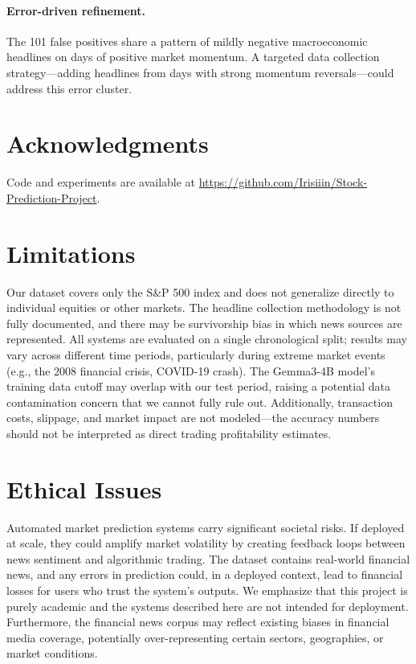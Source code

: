 \documentclass[11pt]{article}
\begin{document}
\paragraph{Error-driven refinement.} The 101 false positives share a pattern of mildly negative macroeconomic headlines on days of positive market momentum. A targeted data collection strategy—adding headlines from days with strong momentum reversals—could address this error cluster.

\section*{Acknowledgments}

Code and experiments are available at \url{https://github.com/Irisiiin/Stock-Prediction-Project}.

\section*{Limitations}

Our dataset covers only the S\&P 500 index and does not generalize directly to individual equities or other markets. The headline collection methodology is not fully documented, and there may be survivorship bias in which news sources are represented. All systems are evaluated on a single chronological split; results may vary across different time periods, particularly during extreme market events (e.g., the 2008 financial crisis, COVID-19 crash). The Gemma3-4B model's training data cutoff may overlap with our test period, raising a potential data contamination concern that we cannot fully rule out. Additionally, transaction costs, slippage, and market impact are not modeled—the accuracy numbers should not be interpreted as direct trading profitability estimates.

\section*{Ethical Issues}

Automated market prediction systems carry significant societal risks. If deployed at scale, they could amplify market volatility by creating feedback loops between news sentiment and algorithmic trading. The dataset contains real-world financial news, and any errors in prediction could, in a deployed context, lead to financial losses for users who trust the system's outputs. We emphasize that this project is purely academic and the systems described here are not intended for deployment. Furthermore, the financial news corpus may reflect existing biases in financial media coverage, potentially over-representing certain sectors, geographies, or market conditions.
\end{document}
